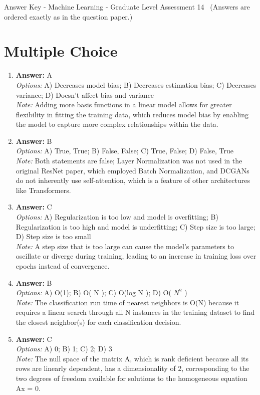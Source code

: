 \documentclass[12pt]{article}
\begin{document}
\begin{center}
Answer Key - Machine Learning - Graduate Level Assessment 14 \
\small (Answers are ordered exactly as in the question paper.)
\end{center}

\section*{Multiple Choice}
\begin{enumerate}[label=\arabic*.]
\item \textbf{Answer:} A
\\ \textit{Options:} A) Decreases model bias; B) Decreases estimation bias; C) Decreases variance; D) Doesn't affect bias and variance
\\ \textit{Note:} Adding more basis functions in a linear model allows for greater flexibility in fitting the training data, which reduces model bias by enabling the model to capture more complex relationships within the data.
\item \textbf{Answer:} B
\\ \textit{Options:} A) True, True; B) False, False; C) True, False; D) False, True
\\ \textit{Note:} Both statements are false; Layer Normalization was not used in the original ResNet paper, which employed Batch Normalization, and DCGANs do not inherently use self-attention, which is a feature of other architectures like Transformers.
\item \textbf{Answer:} C
\\ \textit{Options:} A) Regularization is too low and model is overfitting; B) Regularization is too high and model is underfitting; C) Step size is too large; D) Step size is too small
\\ \textit{Note:} A step size that is too large can cause the model's parameters to oscillate or diverge during training, leading to an increase in training loss over epochs instead of convergence.
\item \textbf{Answer:} B
\\ \textit{Options:} A) O(1); B) O( N ); C) O(log N ); D) O( $N^2$ )
\\ \textit{Note:} The classification run time of nearest neighbors is O(N) because it requires a linear search through all N instances in the training dataset to find the closest neighbor(s) for each classification decision.
\item \textbf{Answer:} C
\\ \textit{Options:} A) 0; B) 1; C) 2; D) 3
\\ \textit{Note:} The null space of the matrix A, which is rank deficient because all its rows are linearly dependent, has a dimensionality of 2, corresponding to the two degrees of freedom available for solutions to the homogeneous equation Ax = 0.
\end{enumerate}
\end{document}
